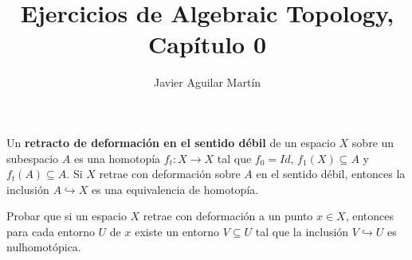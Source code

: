 \documentclass[twoside]{article}
\begin{document}
\title{Ejercicios de Algebraic Topology, Capítulo 0}
\author{Javier Aguilar Martín}
\maketitle

\begin{lemma}[Ejercicio 0.4]
Un \textbf{retracto de deformación en el sentido débil} de un espacio $X$ sobre un subespacio $A$ es una homotopía $f_t:X\to X$ tal que $f_0=Id$, $f_1(X)\subseteq A$ y $f_t(A)\subseteq A$. Si $X$ retrae con deformación sobre $A$ en el sentido débil, entonces la inclusión $A\hookrightarrow X$ es una equivalencia de homotopía. 

\end{lemma}



\begin{ejercicio}{0.5}
Probar que si un espacio $X$ retrae con deformación a un punto $x\in X$, entonces para cada entorno $U$ de $x$ existe un entorno $V\subseteq U$ tal que la inclusión $V\hookrightarrow U$ es nulhomotópica.
\end{ejercicio}

\begin{solucion}

\end{solucion}
\end{document}
